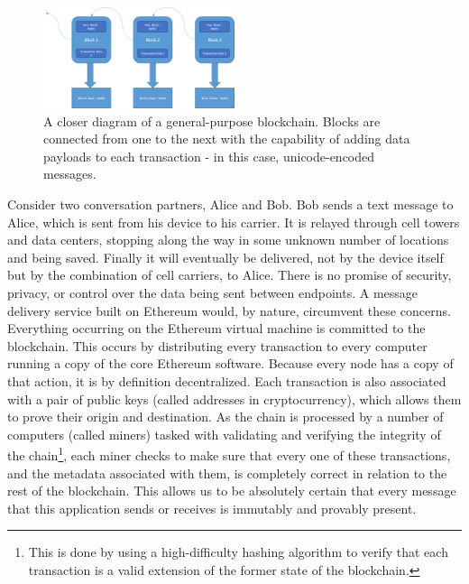 \documentclass[titlepage]{report}
\begin{document}
\begin{figure}[h]
    \centering
    \includegraphics[width=0.5\textwidth]{blockchain}
    \caption{A closer diagram of a general-purpose blockchain. Blocks are connected from one to the next with the capability of adding data payloads to each transaction - in this case, unicode-encoded messages.}
\end{figure}

Consider two conversation partners, Alice and Bob. Bob sends a text message to Alice, which is sent from his device to his carrier. It is relayed through cell towers and data centers, stopping along the way in some unknown number of locations and being saved. Finally it will eventually be delivered, not by the device itself but by the combination of cell carriers, to Alice. There is no promise of security, privacy, or control over the data being sent between endpoints. A message delivery service built on Ethereum would, by nature, circumvent these concerns. Everything occurring on the Ethereum virtual machine is committed to the blockchain. This occurs by distributing every \gls{transaction} to every computer running a copy of the core Ethereum software. Because every \gls{node} has a copy of that action, it is by definition decentralized. Each transaction is also associated with a pair of public keys (called addresses in cryptocurrency), which allows them to prove their origin and destination. As the chain is processed by a number of computers (called miners) tasked with validating and verifying the integrity of the chain\footnote{This is done by using a high-difficulty hashing algorithm to verify that each transaction is a valid extension of the former state of the blockchain.}, each \gls{miner} checks to make sure that every one of these transactions, and the metadata associated with them, is completely correct in relation to the rest of the \gls{blockchain}. This allows us to be absolutely certain that every message that this application sends or receives is immutably and provably present.\cite{blockchain}\\
\end{document}

